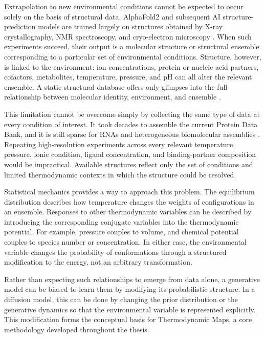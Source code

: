 Extrapolation to new environmental conditions cannot be expected to occur solely on the basis of structural data. AlphaFold2 and subsequent AI structure-prediction models are trained largely on structures obtained by X-ray crystallography, NMR spectroscopy, and cryo-electron microscopy \citep{alphafold-2,alphafold-3,berman2000protein}. When such experiments succeed, their output is a molecular structure or structural ensemble corresponding to a particular set of environmental conditions. Structure, however, is linked to the environment: ion concentrations, protein or nucleic-acid partners, cofactors, metabolites, temperature, pressure, and pH can all alter the relevant ensemble. A static structural database offers only glimpses into the full relationship between molecular identity, environment, and ensemble \citep{yamagami2021functional,huang2025some,tiwary2024generative}.

This limitation cannot be overcome simply by collecting the same type of data at every condition of interest. It took decades to assemble the current Protein Data Bank, and it is still sparse for RNAs and heterogeneous biomolecular assemblies \citep{berman2000protein,Szikszai2024RNA3DB}. Repeating high-resolution experiments across every relevant temperature, pressure, ionic condition, ligand concentration, and binding-partner composition would be impractical. Available structures reflect only the set of conditions and limited thermodynamic contexts in which the structure could be resolved.

Statistical mechanics provides a way to approach this problem. The equilibrium distribution describes how temperature changes the weights of configurations in an ensemble. Responses to other thermodynamic variables can be described by introducing the corresponding conjugate variables into the thermodynamic potential. For example, pressure couples to volume, and chemical potential couples to species number or concentration. In either case, the environmental variable changes the probability of conformations through a structured modification to the energy, not an arbitrary transformation.

Rather than expecting such relationships to emerge from data alone, a generative model can be biased to learn them by modifying its probabilistic structure. In a diffusion model, this can be done by changing the prior distribution or the generative dynamics so that the environmental variable is represented explicitly. This modification forms the conceptual basis for Thermodynamic Maps, a core methodology developed throughout the thesis.

